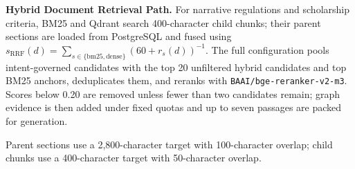 \textbf{Hybrid Document Retrieval Path.}
For narrative regulations and scholarship criteria, BM25 and Qdrant search 400-character child chunks; their parent sections are loaded from PostgreSQL and fused using $s_{\mathrm{RRF}}(d)=\sum_{s\in\{\mathrm{bm25},\mathrm{dense}\}}(60+r_s(d))^{-1}$. The full configuration pools intent-governed candidates with the top 20 unfiltered hybrid candidates and top BM25 anchors, deduplicates them, and reranks with \texttt{BAAI/bge-reranker-v2-m3}. Scores below 0.20 are removed unless fewer than two candidates remain; graph evidence is then added under fixed quotas and up to seven passages are packed for generation.

Parent sections use a 2,800-character target with 100-character overlap;
child chunks use a 400-character target with 50-character overlap.
